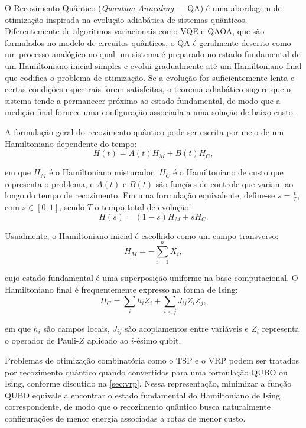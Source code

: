 O Recozimento Quântico (\textit{Quantum Annealing} --- QA) \cite{kadowaki1998quantum, farhi_quantum_2014} é uma abordagem de otimização inspirada na evolução adiabática de sistemas quânticos. Diferentemente de algoritmos variacionais como VQE e QAOA, que são formulados no modelo de circuitos quânticos, o QA é geralmente descrito como um processo analógico no qual um sistema é preparado no estado fundamental de um Hamiltoniano inicial simples e evolui gradualmente até um Hamiltoniano final que codifica o problema de otimização. Se a evolução for suficientemente lenta e certas condições espectrais forem satisfeitas, o teorema adiabático sugere que o sistema tende a permanecer próximo ao estado fundamental, de modo que a medição final fornece uma configuração associada a uma solução de baixo custo.

A formulação geral do recozimento quântico pode ser escrita por meio de um Hamiltoniano dependente do tempo:
\begin{equation}
    H(t) = A(t)H_M + B(t)H_C,
\end{equation}

\noindent em que $H_M$ é o Hamiltoniano misturador, $H_C$ é o Hamiltoniano de custo que representa o problema, e $A(t)$ e $B(t)$ são funções de controle que variam ao longo do tempo de recozimento. Em uma formulação equivalente, define-se $s=\frac{t}{T}$, com $s \in [0,1]$, sendo $T$ o tempo total de evolução:
\begin{equation}
    H(s) = (1-s)H_M + sH_C.
\end{equation}

Usualmente, o Hamiltoniano inicial é escolhido como um campo transverso:
\begin{equation}
    H_M = -\sum_{i=1}^{n} X_i,
\end{equation}

\noindent cujo estado fundamental é uma superposição uniforme na base computacional. O Hamiltoniano final é frequentemente expresso na forma de Ising:
\begin{equation}
    H_C = \sum_i h_i Z_i + \sum_{i<j} J_{ij} Z_i Z_j,
\end{equation}

\noindent em que $h_i$ são campos locais, $J_{ij}$ são acoplamentos entre variáveis e $Z_i$ representa o operador de Pauli-$Z$ aplicado ao $i$-ésimo qubit.

Problemas de otimização combinatória como o TSP e o VRP podem ser tratados por recozimento quântico quando convertidos para uma formulação QUBO ou Ising, conforme discutido na \autoref{sec:vrp}. Nessa representação, minimizar a função QUBO equivale a encontrar o estado fundamental do Hamiltoniano de Ising correspondente, de modo que o recozimento quântico busca naturalmente configurações de menor energia associadas a rotas de menor custo.


